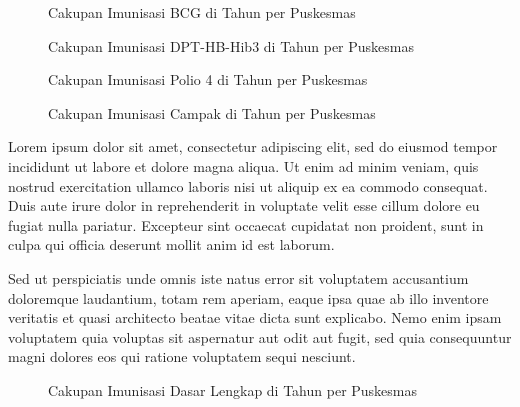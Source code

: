 \begin{figure}[H]
    \centering
    \caption{Cakupan Imunisasi BCG di \namaKabupaten Tahun \tP per Puskesmas}
    \label{fig:Cakupan-Imunisasi-BCG}
\end{figure}

\begin{figure}[H]
    \centering
    \caption{Cakupan Imunisasi DPT-HB-Hib3 di \namaKabupaten Tahun \tP per Puskesmas}
    \label{fig:Cakupan-Imunisasi-DPT}
\end{figure}

\begin{figure}[H]
    \centering
    \caption{Cakupan Imunisasi Polio 4 di \namaKabupaten Tahun \tP per Puskesmas}
    \label{fig:Cakupan-Imunisasi-Polio4}
\end{figure}

\begin{figure}[H]
    \centering
    \caption{Cakupan Imunisasi Campak di \namaKabupaten Tahun \tP per Puskesmas}
    \label{fig:Cakupan-Imunisasi-Campak}
\end{figure}

Lorem ipsum dolor sit amet, consectetur adipiscing elit, sed do eiusmod tempor incididunt ut labore et dolore magna aliqua. Ut enim ad minim veniam, quis nostrud exercitation ullamco laboris nisi ut aliquip ex ea commodo consequat. Duis aute irure dolor in reprehenderit in voluptate velit esse cillum dolore eu fugiat nulla pariatur. Excepteur sint occaecat cupidatat non proident, sunt in culpa qui officia deserunt mollit anim id est laborum.

Sed ut perspiciatis unde omnis iste natus error sit voluptatem accusantium doloremque laudantium, totam rem aperiam, eaque ipsa quae ab illo inventore veritatis et quasi architecto beatae vitae dicta sunt explicabo. Nemo enim ipsam voluptatem quia voluptas sit aspernatur aut odit aut fugit, sed quia consequuntur magni dolores eos qui ratione voluptatem sequi nesciunt.

\begin{figure}[H]
    \centering
    \caption{Cakupan Imunisasi Dasar Lengkap di \namaKabupaten Tahun \tP per Puskesmas}
    \label{fig:Cakupan-Imunisasi-IDL}
\end{figure}

